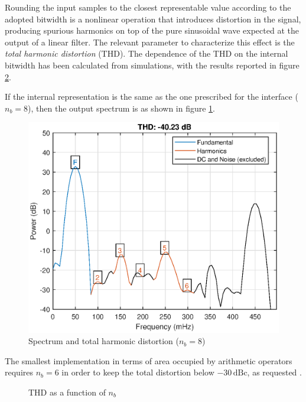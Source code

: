 Rounding the input samples to the closest representable value according to the adopted bitwidth is a nonlinear operation that introduces distortion in the signal, producing spurious harmonics on top of the pure sinusoidal wave expected at the output of a linear filter. The relevant parameter to characterize this effect is the \textit{total harmonic distortion} (THD). The dependence of the THD on the internal bitwidth has been calculated from simulations, with the results reported in figure \ref{fig:thdplot}. 

If the internal representation is the same as the one prescribed for the interface ($n_b=8$), then the output spectrum is as shown in figure \ref{fig:thd8bit}.
\begin{figure}
	\includegraphics[width=\textwidth]{./chapter1/images/thd_with_8b.eps}
	\caption{Spectrum and total harmonic distortion ($n_b=8$)}
	\label{fig:thd8bit}
\end{figure} 

The smallest implementation in terms of area occupied by arithmetic operators requires $n_b=6$ in order to keep the total distortion below $-30\,\textrm{dBc}$, as requested .

\begin{figure}
	\caption{THD as a function of $n_b$}
	\label{fig:thdplot}
\end{figure}

